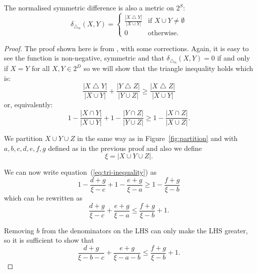 \documentclass[a4paper]{report}
\DeclareMathOperator{\symdif}{\bigtriangleup}
\newcommand{\dset}{D}
\begin{document}
The normalised symmetric difference is also a metric on $2^{S}$:
\begin{equation*}
  \delta_{\symdif_n}(X,Y) =
  \begin{cases}
    \displaystyle \frac{|X \symdif Y|}{|X \cup Y|} & \text{if $X \cup Y \neq
      \emptyset$} \\
    0 & \text{otherwise.}
  \end{cases}
\end{equation*}

\begin{proof}
  The proof shown here is from \citep{yianilos91}, with some corrections.
  Again, it is easy to see the function is non-negative, symmetric and that
  $\delta_{\symdif_n}(X,Y)=0$ if and only if $X=Y$ for all $X,Y \in 2^{\dset}$
  so we will show that the triangle inequality holds which is:
  \begin{equation*}
    \frac{|X \symdif Y|}{|X \cup Y|} + \frac{|Y \symdif Z|}{|Y \cup Z|} \geq
    \frac{|X \symdif Z|}{|X \cup Y|}
  \end{equation*}
  or, equivalently:
  \begin{equation}
    \label{eq:tri-inequality}
    1 - \frac{|X \cap Y|}{|X \cup Y|} +
    1 - \frac{|Y \cap Z|}{|Y \cup Z|} \geq
    1 - \frac{|X \cap Z|}{|X \cup Z|}.
  \end{equation}

  We partition $X \cup Y \cup Z$ in the same way as in
  Figure~\ref{fig:partition} and with $a,b,c,d,e,f,g$ defined as in the
  previous proof and also we define
  \begin{equation*}
    \xi  = |X \cup Y \cup Z|.
  \end{equation*}

  We can now write equation~(\ref{eq:tri-inequality}) as
  \begin{equation*}
    1 - \frac{d+g}{\xi -c} + 1 - \frac{e+g}{\xi -a} \geq 1 - \frac{f+g}{\xi -b}
  \end{equation*}
  which can be rewritten as
  \begin{equation*}
    \frac{d+g}{\xi -c} + \frac{e+g}{\xi -a} \leq \frac{f+g}{\xi -b} + 1.
  \end{equation*}

  Removing $b$ from the denominators on the LHS can only make the LHS
  greater, so it is sufficient to show that
  \begin{equation*}
    \frac{d+g}{\xi -b-c} + \frac{e+g}{\xi -a-b} \leq \frac{f+g}{\xi -b} + 1.
  \end{equation*}


\end{proof}
\end{document}

